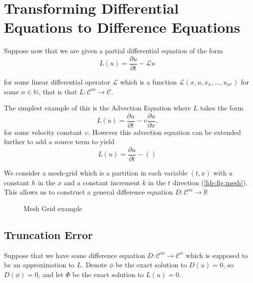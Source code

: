 \documentclass[../main.tex]{subfiles}
\begin{document}
  \section{Transforming Differential Equations to Difference Equations}
  Suppose now that we are given a partial differential equation of the form\\

  \begin{equation}
    L(u) = \frac{\partial u}{\partial t} - \mathcal{L}u
  \end{equation}

  for some linear differential operator $\mathcal{L}$ which is a function $\mathcal{L}(x, u, x_x, ..., u_{x^n})$ for some $n \in \mathbb{N}$, that is that $L :  \mathcal{C}^m \to \mathcal{C}$.

  \begin{example}
    The simplest example of this is the Advection Equation where $L$ takes the form
    \begin{equation}
      L(u) = \frac{\partial u}{\partial t} - \upsilon \frac{\partial u}{\partial x}.
    \end{equation}
    for some velocity constant $\upsilon$. However this advection equation can be extended further to add a source term to yield
    \begin{equation}
      L(u) = \frac{\partial u}{\partial t} - \left( \right)
    \end{equation}
  \end{example}


  We consider a mesh-grid which is a partition in each variable $(t, x)$ with a constant $h$ in the $x$ and a constant increment $k$ in the $t$ direction (\autoref{fde:fig:mesh}). This allows us to construct a general difference equation $D: \mathcal{C}^m \to \mathbb{R}$

  \begin{figure}[b]
    \centering
    \caption{Mesh Grid example}\label{fde:fig:mesh}
  \end{figure}

  \subsection{Truncation Error}\label{sec:fdes:truncation}
  Suppose that we have some difference equation $D : \mathcal{C}^m \to \mathcal{C}^n$ which is supposed to be an approximation to $L$. Denote $\phi$ be the exact solution to $D(u) = 0$, so $D(\phi) = 0$, and let $\Phi$ be the exact solution to $L(u) = 0$.
\end{document}
